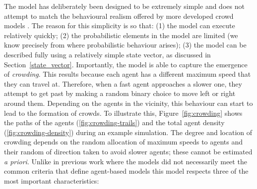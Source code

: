 The model has deliberately been designed to be extremely simple and does not attempt to match the behavioural realism offered by more developed crowd models \citep{chen_multiagentbased_2017, helbing_simulating_2000, klugl_largescale_2007, vanderwal_simulating_2017}. The reason for this simplicity is so that: (1) the model can execute relatively quickly; (2) the probabilistic elements in the model are limited (we know precisely from where probabilistic behaviour arises); (3) the model can be described fully using a relatively simple state vector, as discussed in Section~\ref{state_vector}. Importantly, the model is able to capture the emergence of \textit{crowding}. This results because each agent has a different maximum speed that they can travel at. Therefore, when a fast agent approaches a slower one, they attempt to get past by making a random binary choice to move left or right around them. Depending on the agents in the vicinity, this behaviour can start to lead to the formation of crowds. To illustrate this, Figure~\ref{fig:crowding} shows the paths of the agents (\ref{fig:crowding-trails}) and the total agent density (\ref{fig:crowding-density}) during an example simulation.   The degree and location of crowding depends on the random allocation of maximum speeds to agents and their random of direction taken to avoid slower agents; these cannot be estimated \textit{a priori}. Unlike in previous work where the models did not necessarily meet the common criteria that define agent-based models \citep[e.g.]{lloyd_exploring_2016, ward_dynamic_2016} this model respects three of the most important characteristics: 

